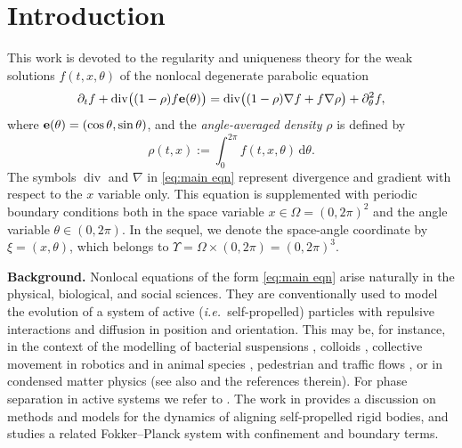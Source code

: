 \documentclass[11pt,a4paper,reqno]{amsart}
\theoremstyle{remark}
\theoremstyle{definition}
\numberwithin{equation}{section}
\DeclareMathOperator{\dv}{div}
\newcommand{\e}{{\bf e}}
\newcommand{\bxi}{\xi}
\renewcommand{\d}{\, \mathrm{d} }
\begin{document}
\vspace*{-1cm}

\setcounter{tocdepth}{1}
\begin{scriptsize}
    \tableofcontents
\end{scriptsize}

\vspace*{-1.4cm}

\section{Introduction}

This work is devoted to the regularity and uniqueness theory for the weak solutions $f(t,x,\theta)$ of the nonlocal degenerate parabolic equation 
\begin{equation}\label{eq:main eqn}
    \partial_t f +   \dv \!\big(  (1- \rho) f \e(\theta)\big)
= \dv \!\big( (1-\rho)\nabla f + f \nabla \rho \big) + \partial_{\theta}^2 f, 
\end{equation}
where $\e(\theta) = (\cos \theta, \sin \theta)$, and the \emph{angle-averaged density} $\rho$ is defined by 
\begin{equation}\label{eq:rho def}
    \rho(t,x) := \int_0^{2\pi} \!\!\! f(t,x,\theta) \d \theta.
\end{equation}
The symbols $\dv$ and $\nabla$ in \eqref{eq:main eqn} represent divergence and gradient with respect to the $x$ variable only. This equation is supplemented with periodic boundary conditions both in the space variable $x \in \Omega = (0,2\pi)^2$ and the angle variable $\theta \in (0,2\pi)$. In the sequel, we denote the space-angle coordinate by $\bxi = (x,\theta)$, which belongs to $\Upsilon = \Omega \times (0,2\pi) = (0,2\pi)^3$. 

\noindent\textbf{Background.} Nonlocal equations of the form \eqref{eq:main eqn} arise naturally in the physical, biological, and social sciences. They are conventionally used to model the evolution of a system of active (\textit{i.e.~}self-propelled) particles with repulsive interactions and diffusion in position and orientation. This may be, for instance, in the context of the modelling of bacterial suspensions \cite{bacterial suspensions}, colloids \cite{self propelled colloids}, collective movement in robotics and in animal species \cite{collective}, pedestrian and traffic flows \cite{pedestrian}, or in condensed matter physics (see also \cite{Cates:2013ia,Romanczuk:2012iz,
Yeomans:2015dt} and the references therein).  For phase separation in active systems we refer to \cite{Redner.2013,
Speck:2015um}. The work in \cite{DegondEtAl} provides a discussion on methods and models for the dynamics of aligning self-propelled rigid bodies, and \cite{MinTang1} studies a related Fokker--Planck system with confinement and boundary terms. 
\end{document}
